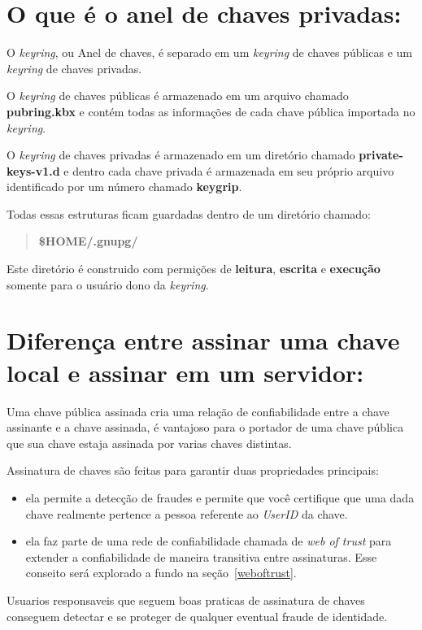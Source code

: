 \documentclass[12pt, letterpaper]{article}
\begin{document}
\section{O que é o anel de chaves privadas:}

O \textit{keyring}, ou Anel de chaves, é separado em
um \textit{keyring} de chaves públicas e um \textit{keyring}
de chaves privadas.

O \textit{keyring} de chaves públicas é armazenado
em um arquivo chamado \textbf{pubring.kbx} e contém
todas as informações de cada chave pública importada
no \textit{keyring}.

O \textit{keyring} de chaves privadas é armazenado
em um diretório chamado \textbf{private-keys-v1.d}
e dentro cada chave privada é armazenada em seu
próprio arquivo identificado por um número chamado
\textbf{keygrip}.

Todas essas estruturas ficam guardadas dentro de
um diretório chamado:
\begin{quote}
  \textbf{\$HOME/.gnupg/}
\end{quote}
Este diretório é construido com permições de \textbf{leitura}, \textbf{escrita}
e \textbf{execução} somente para o usuário dono da \textit{keyring}.

\section{Diferença entre assinar uma chave local e assinar em um servidor:}

Uma chave pública assinada cria uma relação de confiabilidade entre
a chave assinante e a chave assinada, é vantajoso para o portador de
uma chave pública que sua chave estaja assinada por varias chaves distintas.

Assinatura de chaves são feitas para garantir duas propriedades principais:
\begin{itemize}
    \item ela permite a detecção de fraudes e permite que você certifique
      que uma dada chave realmente pertence a pessoa referente ao \textit{UserID}
      da chave.
    \item ela faz parte de uma rede de confiabilidade chamada de \textit{web of trust}
      para extender a confiabilidade de maneira transitiva entre assinaturas. Esse conseito
      será explorado a fundo na seção~\ref{weboftrust}.
\end{itemize}
Usuarios responsaveis que seguem boas praticas de assinatura de chaves conseguem
detectar e se proteger de qualquer eventual fraude de identidade.
\end{document}
